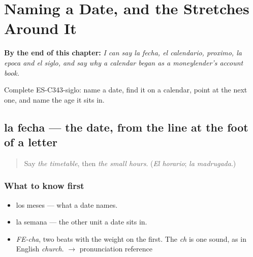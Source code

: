 
\chapter{Naming a Date, and the Stretches Around It}
\label{ch:la-fecha-y-el-siglo}

\begin{chapteropening}
\textbf{By the end of this chapter:} \emph{I can say la fecha, el calendario, proximo, la epoca and el siglo, and say why a calendar began as a moneylender's account book.}

Complete ES-C343-siglo: name a date, find it on a calendar, point at the next one, and name the age it sits in.
\end{chapteropening}

\section[la fecha]{la fecha — the date, from the line at the foot of a letter}

\label{lesson:ES-C343-fecha}



\begin{quote}
Say \emph{the timetable}, then \emph{the small hours}. (\emph{El horario}; \emph{la madrugada}.)
\end{quote}

\subsection*{What to know first}
\begin{itemize}
\raggedright
  \item los meses — what a date names.
  \item la semana — the other unit a date sits in.
\end{itemize}

\begin{sounds}
\begin{itemize}
\raggedright
  \item \emph{FE-cha}, two beats with the weight on the first. The \emph{ch} is one sound, as in English \emph{church}. $\to$ pronunciation reference
\end{itemize}
\end{sounds}

